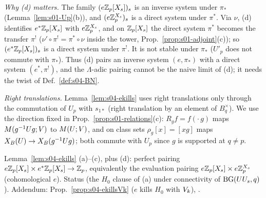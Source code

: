 \noindent\emph{Why (d) matters.} The family $(e\mathbb{Z}_p[X_s])_s$ is an inverse system under $\pi_*$ (Lemma~\ref{lem:s01-Up}(b)), and
$(e\mathbb{Z}_p^{X_s})_s$ is a direct system under $\pi^*$. Via $\nu$, (d) identifies $e^*\mathbb{Z}_p[X_s]$ with $e\mathbb{Z}_p^{X_s}$, and on $\mathbb{Z}_p[X_s]$ the
direct system $\pi^*$ becomes the transfer $\pi^!$ ($\nu'\circ\pi^!=\pi^*\circ\nu$ inside the tower, Prop.~\ref{prop:s01-adjoint}(c)); so
$(e^*\mathbb{Z}_p[X_s])_s$ is a direct system under $\pi^!$. It is not stable under $\pi_*$ ($U'_p$ does not commute with $\pi_*$). Thus (d)
pairs an inverse system $(e,\pi_*)$ with a direct system $(e^*,\pi^!)$, and the $\Lambda$-adic pairing cannot be the naive limit of (d);
it needs the twist of Def.~\ref{def:s04-BN}.

\noindent\emph{Right translations.} Lemma~\ref{lem:s04-ekills} uses right translations only through the commutation of
$U_p$ with $s_{1*}$ (right translation by an element of $B_q^\times$). We use the direction fixed in
Prop.~\ref{prop:s01-relations}(c): $R_gf=f(\cdot\,g)$ maps $M(g^{-1}Ug;V)$ to $M(U;V)$, and on class sets
$\rho_g[x]=[xg]$ maps $X_B(U)\to X_B(g^{-1}Ug)$; both commute with $U_p$ since $g$ is supported at $q\ne p$.

\begin{interface}\label{if:s04-ekills}
Lemma~\ref{lem:s04-ekills} (a)--(c), plus (d): perfect pairing $e\mathbb{Z}_p[X_s]\times e^*\mathbb{Z}_p[X_s]\to\mathbb{Z}_p$, equivalently the evaluation pairing
$e\mathbb{Z}_p[X_s]\times e\mathbb{Z}_p^{X_s}$ (cohomological $e$). Status \stproved{} (the $H_0$ clause of (a) under connectivity of $\mathrm{BG}(UU_s,q)$).
Addendum: Prop.~\ref{prop:s04-ekillsVk} ($e$ kills $H_0$ with $V_k$), \sttoprove.
\end{interface}
